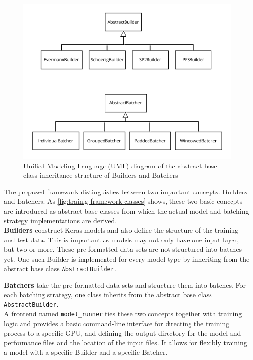\begin{figure}
    \centering
    \includegraphics[width=\textwidth]{gfx/training-framework-classes.png}
    \caption[UML diagram of the framework classes]{Unified Modeling Language (UML) diagram of the abstract base class inheritance structure of Builders and Batchers}
    \label{fig:trainig-framework-classes}
\end{figure}

The proposed framework distinguishes between two important concepts: Builders and Batchers. As \autoref{fig:trainig-framework-classes} shows, these two basic concepts are introduced as abstract base classes from which the actual model and batching strategy implementations are derived.\\

\noindent\textbf{Builders} construct Keras models and also define the structure of the training and test data. This is important as models may not only have one input layer, but two or more. These pre-formatted data sets are not structured into batches yet. One such Builder is implemented for every model type by inheriting from the abstract base class \verb=AbstractBuilder=.

\noindent\textbf{Batchers} take the pre-formatted data sets and structure them into batches. For each batching strategy, one class inherits from the abstract base class \verb=AbstractBuilder=.\\

A frontend named \verb=model_runner= ties these two concepts together with training logic and provides a basic command-line interface for directing the training process to a specific GPU, and defining the output directory for the model and performance files and the location of the input files. It allows for flexibly training a model with a specific Builder and a specific Batcher.\\

